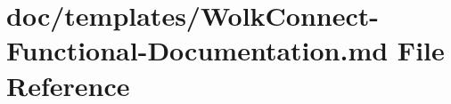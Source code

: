 \hypertarget{_wolk_connect-_functional-_documentation_8md}{}\section{doc/templates/\+Wolk\+Connect-\/\+Functional-\/\+Documentation.md File Reference}
\label{_wolk_connect-_functional-_documentation_8md}

